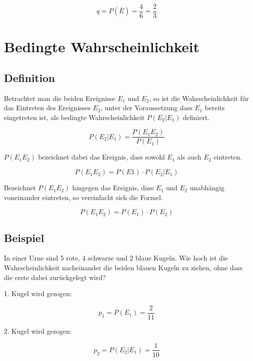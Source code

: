 \begin{displaymath}
q=P(\bar{E})=\frac{4}{6}=\frac{2}{3}
\end{displaymath}

\section{Bedingte Wahrscheinlichkeit}

\subsection*{Definition}

Betrachtet man die beiden Ereignisse $E_1$ und $E_2$, so ist die Wahrscheinlichkeit für das Eintreten des Ereignisses $E_2$, unter der Voraussetzung dass $E_1$ bereits eingetreten ist, als bedingte Wahrscheinlichkeit $P(E_2|E_1)$ definiert. 

\begin{displaymath}
P(E_2|E_1)=\frac{P(E_1 E_2)}{P(E_1)}
\end{displaymath}

$P(E_1 E_2)$ bezeichnet dabei das Ereignis, dass sowohl $E_1$ als auch $E_2$ eintreten. 

\begin{displaymath}
P(E_1 E_2)=P(E1) \cdot P(E_2|E_1)
\end{displaymath}

Bezeichnet $P(E_1 E_2)$ hingegen das Ereignis, dass $E_1$ und $E_2$ unabhängig voneinander eintreten, so vereinfacht sich die Formel.

\begin{displaymath}
P(E_1 E_2)=P(E_1) \cdot P(E_2)
\end{displaymath}

\subsection*{Beispiel}

In einer Urne sind 5 rote, 4 schwarze und 2 blaue Kugeln. Wie hoch ist die Wahrscheinlichkeit nacheinander die beiden blauen Kugeln zu ziehen, ohne dass die erste dabei zurückgelegt wird? 

1. Kugel wird gezogen:

\begin{displaymath}
p_1=P(E_1)=\frac{2}{11}
\end{displaymath}

2. Kugel wird gezogen:

\begin{displaymath}
p_2=P(E_2|E_1)=\frac{1}{10}
\end{displaymath}


